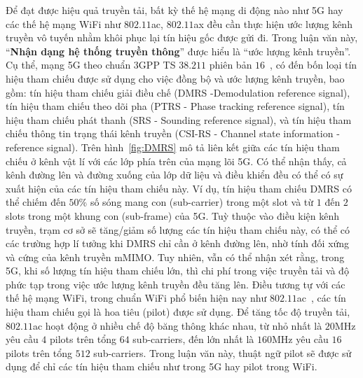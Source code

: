 Để đạt được hiệu quả truyền tải, bất kỳ thế hệ mạng di động nào như 5G hay các thế hệ mạng WiFi như $802.11$ac, $802.11$ax đều cần thực hiện ước lượng kênh truyền vô tuyến nhằm khôi phục lại tín hiệu gốc được gửi đi. Trong luận văn này, ``\textbf{Nhận dạng hệ thống truyền thông}'' được hiểu là ``ước lượng kênh truyền''. Cụ thể, mạng 5G theo chuẩn 3GPP TS $38.211$ phiên bản $16$~\cite{r16}, có đến bốn loại tín hiệu tham chiếu được sử dụng cho việc đồng bộ và ước lượng kênh truyền, bao gồm: tín hiệu tham chiếu giải điều chế (DMRS -Demodulation reference signal), tín hiệu tham chiếu theo dõi pha (PTRS - Phase tracking reference signal), tín hiệu tham chiếu phát thanh (SRS - Sounding reference signal), và tín hiệu tham chiếu thông tin trạng thái kênh truyền (CSI-RS - Channel state information - reference signal). Trên hình~\ref{fig:DMRS} mô tả liên kết giữa các tín hiệu tham chiếu ở kênh vật lí với các lớp phía trên của mạng lõi 5G. Có thể nhận thấy, cả kênh đường lên và đường xuống của lớp dữ liệu và điều khiển đều có thể có sự xuất hiện của các tín hiệu tham chiếu này. Ví dụ, tín hiệu tham chiếu DMRS có thể chiếm đến $50$\% số sóng mang con (sub-carrier) trong một slot và từ $1$ đến $2$ slots trong một khung con (sub-frame) của 5G. Tuỳ thuộc vào điều kiện kênh truyền, trạm cơ sở sẽ tăng/giảm số lượng các tín hiệu tham chiếu này, có thể có các trường hợp lí tưởng khi DMRS chỉ cần ở kênh đường lên, nhờ tính đối xứng và cứng của kênh truyền mMIMO. Tuy nhiên, vẫn có thể nhận xét rằng, trong 5G, khi số lượng tín hiệu tham chiếu lớn, thì chi phí trong việc truyền tải và độ phức tạp trong việc ước lượng kênh truyền đều tăng lên. Điều tương tự với các thế hệ mạng WiFi, trong chuẩn WiFi phổ biến hiện nay như $802.11$ac~\cite{80211ac}, các tín hiệu tham chiếu gọi là hoa tiêu (pilot) được sử dụng. Để tăng tốc độ truyền tải, $802.11$ac hoạt động ở nhiều chế độ băng thông khác nhau, từ nhỏ nhất là $20$MHz yêu cầu $4$ pilots trên tổng $64$ sub-carriers, đến lớn nhất là $160$MHz yêu cầu $16$ pilots trên tổng $512$ sub-carriers. Trong luận văn này, thuật ngữ pilot sẽ được sử dụng để chỉ các tín hiệu tham chiếu như trong 5G hay pilot trong WiFi.


